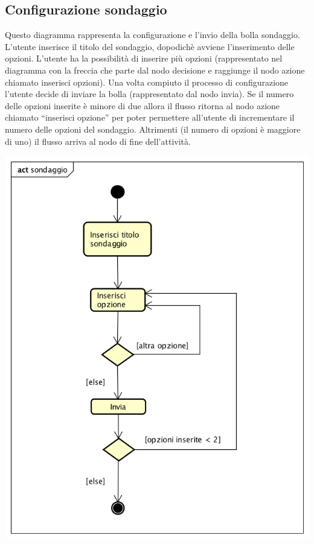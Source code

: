 \subsection{Configurazione sondaggio}
Questo diagramma rappresenta la configurazione e l'invio della bolla
sondaggio. L’utente inserisce il titolo del sondaggio, dopodichè
avviene l’inserimento delle opzioni. L’utente ha la possibilità di
inserire più opzioni (rappresentato nel diagramma con la freccia che
parte dal nodo decisione e raggiunge il nodo azione chiamato inserisci
opzioni). Una volta compiuto il processo di configurazione l’utente
decide di inviare la bolla (rappresentato dal nodo invia). Se il
numero delle opzioni inserite è minore di due allora il flusso ritorna
al nodo azione chiamato “inserisci opzione” per poter permettere
all’utente di incrementare il numero delle opzioni del
sondaggio. Altrimenti (il numero di opzioni è maggiore di uno) il
flusso arriva al nodo di fine dell’attività. 

\begin{center}
  \includegraphics[scale=0.5]{img/Sondaggio.png}
\end{center}


